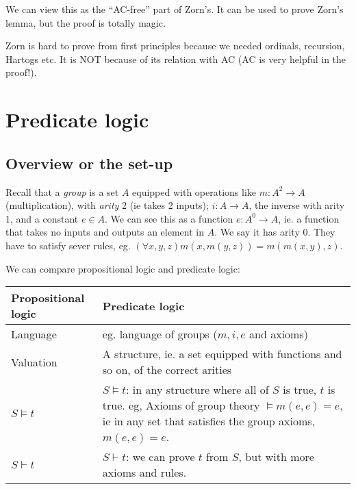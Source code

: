 \documentclass[a4paper]{article}
\begin{document}
We can view this as the ``AC-free'' part of Zorn's. It can be used to prove Zorn's lemma, but the proof is totally magic.

\note Zorn is hard to prove from first principles because we needed ordinals, recursion, Hartogs etc. It is NOT because of its relation with AC (AC is very helpful in the proof!).

\section{Predicate logic}
\subsection{Overview or the set-up}
Recall that a \emph{group} is a set $A$ equipped with operations like $m: A^2\to A$ (multiplication), with \emph{arity} 2 (ie takes 2 inputs); $i: A\to A$, the inverse with arity 1, and a constant $e\in A$. We can see this as a function $e: A^0 \to A$, ie. a function that takes no inputs and outputs an element in $A$. We say it has arity 0. They have to satisfy sever rules, eg. $(\forall x, y, z) m(x, m(y, z)) = m(m(x, y), z)$.

We can compare propositional logic and predicate logic:

\noindent\begin{tabular}{p{}p{}}
  \toprule
  Propositional logic & Predicate logic\\
  \midrule
  Language & eg. language of groups ($m, i, e$ and axioms)\\
  Valuation & A structure, ie. a set equipped with functions and so on, of the correct arities\\
  $S\models t$ & $S\models t$: in any structure where all of $S$ is true, $t$ is true. eg, Axioms of group theory $\models m(e, e) = e$, ie in any set that satisfies the group axioms, $m(e, e) = e$.\\
  $S\vdash t$ & $S\vdash t$: we can prove $t$ from $S$, but with more axioms and rules.\\
  \bottomrule
\end{tabular}
\end{document}
